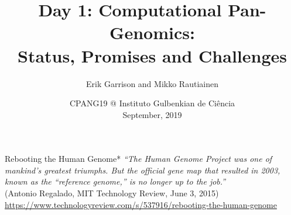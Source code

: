 \documentclass[notes=hide]{beamer}
\title{Day 1: Computational Pan-Genomics:\\Status, Promises and Challenges}
\author[TM]{Erik Garrison and Mikko Rautiainen}
\date{CPANG19 @ Instituto Gulbenkian de Ci\^{e}ncia\\ September, 2019}
\newcommand{\0}{\ensuremath{\mathtt{0}}}
\newcommand{\1}{\ensuremath{\mathtt{1}}}
\begin{document}
\frame[plain]{\titlepage}



\begin{frame}{Rebooting the Human Genome*}
\textit{"`The Human Genome Project was one of mankind’s greatest triumphs. But the official gene map that resulted in 2003, known as the “reference genome,” is no longer up to the job."'}\\[1em]
(Antonio Regalado, MIT Technology Review, June 3, 2015)\\[5em]

{\scriptsize *\url{https://www.technologyreview.com/s/537916/rebooting-the-human-genome}}
\end{frame}
\end{document}
